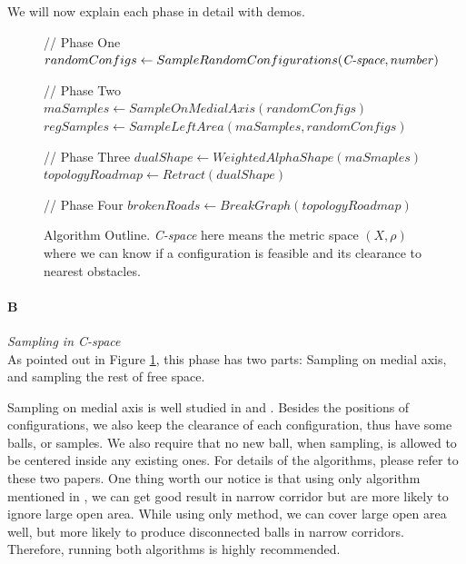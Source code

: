 \documentclass[11pt]{article}
\begin{document}
\indent We will now explain each phase in detail with demos.

\begin{figure}
  \begin{algorithmic}[1]
  
    // Phase One
    \indent \State $randomConfigs \gets SampleRandomConfigurations( \emph{C-space}, number )$ 

    // Phase Two
    \indent \State $maSamples \gets SampleOnMedialAxis( randomConfigs )$
    \indent \State $regSamples \gets SampleLeftArea(maSamples, randomConfigs)$

    // Phase Three
    \indent \State $dualShape \gets WeightedAlphaShape( maSmaples )$
    \indent \State $topologyRoadmap \gets Retract(dualShape)$ 

    // Phase Four
    \indent \State $brokenRoads \gets BreakGraph( topologyRoadmap )$
    
    \indent 
	
  \EndFunction
  \end{algorithmic}
  \caption{\label{fig:Algo} Algorithm Outline. \emph{C-space} here means the metric space $(X, \rho)$ where we can know if a configuration is feasible and its clearance to nearest obstacles.}
\end{figure}

\paragraph{B} \emph{Sampling in C-space} \hfill \\
\indent As pointed out in Figure \ref{fig:Algo}, this phase has two parts: Sampling on medial axis, and sampling the rest of free space. 

\indent Sampling on medial axis is well studied in \cite{MAPRM} and \cite{UMAPRM}. Besides the positions of configurations, we also keep the clearance of each configuration, thus have some balls, or samples. We also require that no new ball, when sampling, is allowed to be centered inside any existing ones. For details of the algorithms, please refer to these two papers. One thing worth our notice is that using only algorithm mentioned in \cite{MAPRM}, we can get good result in narrow corridor but are more likely to ignore large open area. While using only \cite{UMAPRM} method, we can cover large open area well, but more likely to produce disconnected balls in narrow corridors. Therefore, running both algorithms is highly recommended. 
\end{document}
